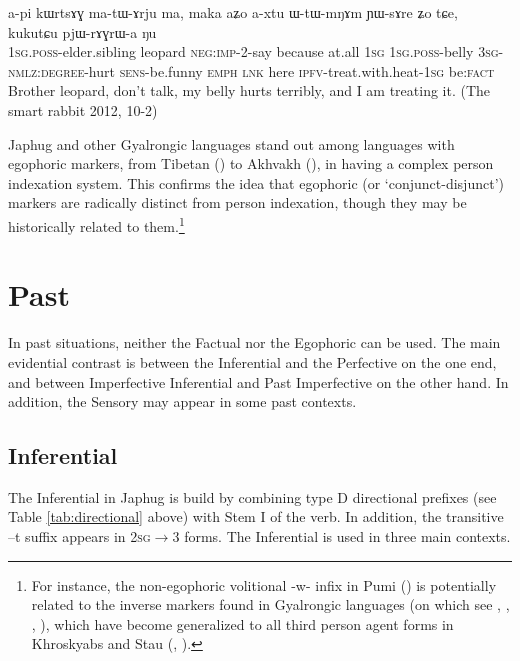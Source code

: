 \documentclass[oldfontcommands,oneside,a4paper,11pt]{article}
\newcommand{\ipa}[1]{{\phon \mbox{#1}}} %
\newcommand{\factual}[1]{\textsc{:fact}}
\begin{document}
 \begin{exe}
\ex \label{ex:pjWrAGrWa}
\gll
 \ipa{a-pi} 	\ipa{kɯrtsɤɣ} 	\ipa{ma-tɯ-ɤrju} 	\ipa{ma,} 	\ipa{maka} 	\ipa{aʑo} 	\ipa{a-xtu} 	\ipa{ɯ-tɯ-mŋɤm} 	\ipa{ɲɯ-sɤre} 	\ipa{ʑo} 	\ipa{tɕe,} 	\ipa{kukutɕu} 	\ipa{pjɯ-rɤɣrɯ-a} 	\ipa{ŋu} 	\\
 \textsc{1sg.poss}-elder.sibling leopard \textsc{neg:imp}-2-say because at.all \textsc{1sg} \textsc{1sg.poss}-belly \textsc{3sg-nmlz:degree}-hurt \textsc{sens}-be.funny \textsc{emph} \textsc{lnk} here \textsc{ipfv}-treat.with.heat-\textsc{1sg} be\factual{}  \\
\glt Brother leopard, don't talk, my belly hurts terribly, and I am treating it. (The smart rabbit 2012, 10-2)
 \end{exe}
 
Japhug and other Gyalrongic languages stand out among languages with egophoric markers, from Tibetan (\citealt{tournadre08conjunct}) to Akhvakh (\citealt{creissels08akhvakh}), in having  a complex person indexation system. This confirms the idea that egophoric (or `conjunct-disjunct') markers are radically distinct from person indexation, though they may be historically related to them.\footnote{For instance, the non-egophoric volitional \ipa{-w-} infix in Pumi (\citealt{daudey14volition}) is potentially related to the inverse markers found in Gyalrongic languages (on which see \citealt{delancey81direction}, \citealt{jackson02rentongdengdi}, \citealt{jacques10inverse}, \citealt{gongxun14agreement}), which have become generalized to all third person agent forms in Khroskyabs and Stau (\citealt{jacques14rtau}, \citealt{lai14person}).}

 
\section{Past} \label{sec:evd:pst}
In past situations, neither the Factual nor the Egophoric  can be used. The main evidential contrast is between the Inferential and the Perfective on the one end, and between Imperfective Inferential and Past Imperfective on the other hand. In addition, the Sensory may appear in some past contexts.


\subsection{Inferential}  \label{sec:ifr}
The Inferential in Japhug is build by combining type D directional prefixes (see Table \ref{tab:directional} above) with Stem I of the verb. In addition, the transitive \ipa{--t} suffix appears in \textsc{2sg}$\rightarrow$3 forms. The Inferential is used in three main contexts. 
\end{document}
